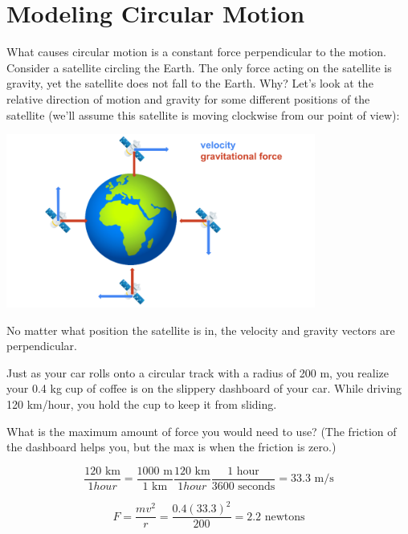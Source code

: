 \section{Modeling Circular Motion}
What causes circular motion is a constant force perpendicular to the motion. Consider a satellite circling the Earth. The only force acting on the satellite is gravity, yet the satellite does not fall to the Earth. Why? Let's look at the relative direction of motion and gravity for some different positions of the satellite (we'll assume this satellite is moving clockwise from our point of view):

\begin{center}
\includegraphics[width=4in]{satellite.png}
\end{center}

No matter what position the satellite is in, the velocity and gravity vectors are perpendicular. 


\begin{Exercise}[title={Circular Motion}, label=circular]
Just as your car rolls onto a circular track with a radius of 200 m,
you realize your 0.4 kg cup of coffee is on the slippery dashboard of your
car.  While driving 120 km/hour, you hold the cup to keep it from sliding.

What is the maximum amount of force you would need to use? (The friction of
the dashboard helps you, but the max is when the friction is zero.)

\end{Exercise}
\begin{Answer}[ref=circular]
  $$\frac{120 \text{ km}}{1 hour} = \frac{1000 \text{ m}}{1 \text{ km}}\frac{120 \text{ km}}{1 hour} \frac{1 \text{ hour}}{3600 \text{ seconds}}= 33.3 \text{ m/s}$$

  $$F = \frac{m v^2}{r} = \frac {0.4 (33.3)^2}{200} = 2.2 \text{ newtons}$$
\end{Answer}

